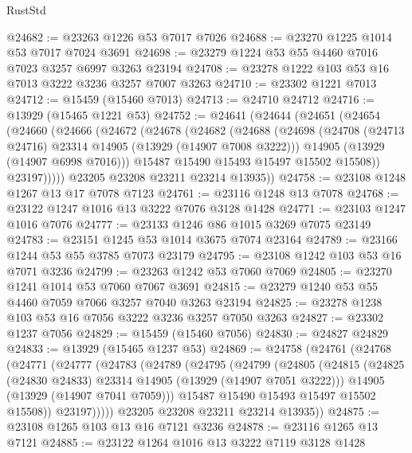 \begin{lexlean}{RustStd}
\begin{coremodule}
@24682 := @23263 @1226 @53 @7017 @7026
@24688 := @23270 @1225 @1014 @53 @7017 @7024 @3691
@24698 := @23279 @1224 @53 @55 @4460 @7016 @7023 @3257 @6997 @3263 @23194
@24708 := @23278 @1222 @103 @53 @16 @7013 @3222 @3236 @3257 @7007 @3263
@24710 := @23302 @1221 @7013
@24712 := @15459 (@15460 @7013)
@24713 := @24710 @24712
@24716 := @13929 (@15465 @1221 @53)
@24752 := @24641
    (@24644
      (@24651
        (@24654
          (@24660
            (@24666
              (@24672
                (@24678
                  (@24682
                    (@24688
                      (@24698
                        (@24708 (@24713 @24716) @23314 @14905 (@13929 (@14907 @7008 @3222)))
                        @14905
                        (@13929 (@14907 @6998 @7016)))
                      @15487
                      @15490
                      @15493
                      @15497
                      @15502
                      @15508))
                  @23197)))))
        @23205
        @23208
        @23211
        @23214
        @13935))
@24758 := @23108 @1248 @1267 @13 @17 @7078 @7123
@24761 := @23116 @1248 @13 @7078
@24768 := @23122 @1247 @1016 @13 @3222 @7076 @3128 @1428
@24771 := @23103 @1247 @1016 @7076
@24777 := @23133 @1246 @86 @1015 @3269 @7075 @23149
@24783 := @23151 @1245 @53 @1014 @3675 @7074 @23164
@24789 := @23166 @1244 @53 @55 @3785 @7073 @23179
@24795 := @23108 @1242 @103 @53 @16 @7071 @3236
@24799 := @23263 @1242 @53 @7060 @7069
@24805 := @23270 @1241 @1014 @53 @7060 @7067 @3691
@24815 := @23279 @1240 @53 @55 @4460 @7059 @7066 @3257 @7040 @3263 @23194
@24825 := @23278 @1238 @103 @53 @16 @7056 @3222 @3236 @3257 @7050 @3263
@24827 := @23302 @1237 @7056
@24829 := @15459 (@15460 @7056)
@24830 := @24827 @24829
@24833 := @13929 (@15465 @1237 @53)
@24869 := @24758
    (@24761
      (@24768
        (@24771
          (@24777
            (@24783
              (@24789
                (@24795
                  (@24799
                    (@24805
                      (@24815
                        (@24825 (@24830 @24833) @23314 @14905 (@13929 (@14907 @7051 @3222)))
                        @14905
                        (@13929 (@14907 @7041 @7059)))
                      @15487
                      @15490
                      @15493
                      @15497
                      @15502
                      @15508))
                  @23197)))))
        @23205
        @23208
        @23211
        @23214
        @13935))
@24875 := @23108 @1265 @103 @13 @16 @7121 @3236
@24878 := @23116 @1265 @13 @7121
@24885 := @23122 @1264 @1016 @13 @3222 @7119 @3128 @1428

\end{coremodule}
\end{lexlean}
